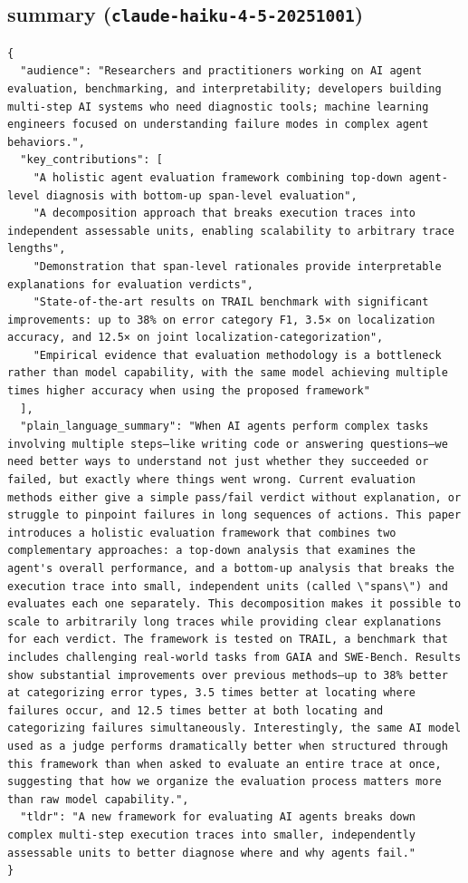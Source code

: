 \documentclass[11pt]{article}
\begin{document}
\subsection*{summary (\texttt{claude-haiku-4-5-20251001})}
\begin{verbatim}
{
  "audience": "Researchers and practitioners working on AI agent evaluation, benchmarking, and interpretability; developers building multi-step AI systems who need diagnostic tools; machine learning engineers focused on understanding failure modes in complex agent behaviors.",
  "key_contributions": [
    "A holistic agent evaluation framework combining top-down agent-level diagnosis with bottom-up span-level evaluation",
    "A decomposition approach that breaks execution traces into independent assessable units, enabling scalability to arbitrary trace lengths",
    "Demonstration that span-level rationales provide interpretable explanations for evaluation verdicts",
    "State-of-the-art results on TRAIL benchmark with significant improvements: up to 38% on error category F1, 3.5× on localization accuracy, and 12.5× on joint localization-categorization",
    "Empirical evidence that evaluation methodology is a bottleneck rather than model capability, with the same model achieving multiple times higher accuracy when using the proposed framework"
  ],
  "plain_language_summary": "When AI agents perform complex tasks involving multiple steps—like writing code or answering questions—we need better ways to understand not just whether they succeeded or failed, but exactly where things went wrong. Current evaluation methods either give a simple pass/fail verdict without explanation, or struggle to pinpoint failures in long sequences of actions. This paper introduces a holistic evaluation framework that combines two complementary approaches: a top-down analysis that examines the agent's overall performance, and a bottom-up analysis that breaks the execution trace into small, independent units (called \"spans\") and evaluates each one separately. This decomposition makes it possible to scale to arbitrarily long traces while providing clear explanations for each verdict. The framework is tested on TRAIL, a benchmark that includes challenging real-world tasks from GAIA and SWE-Bench. Results show substantial improvements over previous methods—up to 38% better at categorizing error types, 3.5 times better at locating where failures occur, and 12.5 times better at both locating and categorizing failures simultaneously. Interestingly, the same AI model used as a judge performs dramatically better when structured through this framework than when asked to evaluate an entire trace at once, suggesting that how we organize the evaluation process matters more than raw model capability.",
  "tldr": "A new framework for evaluating AI agents breaks down complex multi-step execution traces into smaller, independently assessable units to better diagnose where and why agents fail."
}
\end{verbatim}
\end{document}
